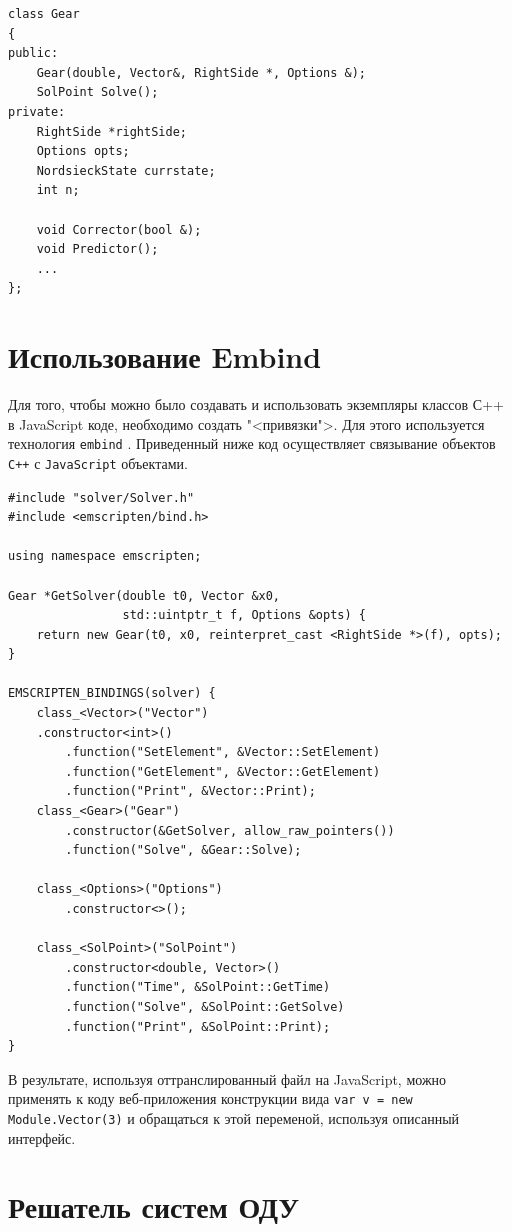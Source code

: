 \documentclass[oneside,final,14pt]{extreport}
\begin{document}
\begin{verbatim}
class Gear
{
public:
    Gear(double, Vector&, RightSide *, Options &);
    SolPoint Solve();
private:
    RightSide *rightSide;
    Options opts;
    NordsieckState currstate;
    int n;
    
    void Corrector(bool &);
    void Predictor();    
    ...
};
\end{verbatim}

\section{Использование Embind}
Для того, чтобы можно было создавать и использовать экземпляры классов С++ в JavaScript коде, необходимо создать "<привязки">. Для этого используется технология \texttt{embind} \cite{emscripten}. Приведенный ниже код осуществляет связывание объектов \texttt{С++} с \texttt{JavaScript} объектами.
\begin{verbatim}
#include "solver/Solver.h"
#include <emscripten/bind.h>

using namespace emscripten;

Gear *GetSolver(double t0, Vector &x0,
                std::uintptr_t f, Options &opts) {
    return new Gear(t0, x0, reinterpret_cast <RightSide *>(f), opts);
}

EMSCRIPTEN_BINDINGS(solver) {
    class_<Vector>("Vector")
    .constructor<int>()
        .function("SetElement", &Vector::SetElement)
        .function("GetElement", &Vector::GetElement)
        .function("Print", &Vector::Print);
    class_<Gear>("Gear")
        .constructor(&GetSolver, allow_raw_pointers())
        .function("Solve", &Gear::Solve);

    class_<Options>("Options")
        .constructor<>();
        		
    class_<SolPoint>("SolPoint")
        .constructor<double, Vector>()
        .function("Time", &SolPoint::GetTime)
        .function("Solve", &SolPoint::GetSolve)
        .function("Print", &SolPoint::Print);
}
\end{verbatim}
В результате, используя оттранслированный файл на JavaScript, можно применять к коду веб-приложения конструкции вида \texttt{var v = new Module.Vector(3)} и обращаться к этой переменой, используя описанный интерфейс.

\section{Решатель систем ОДУ}
\end{document}
